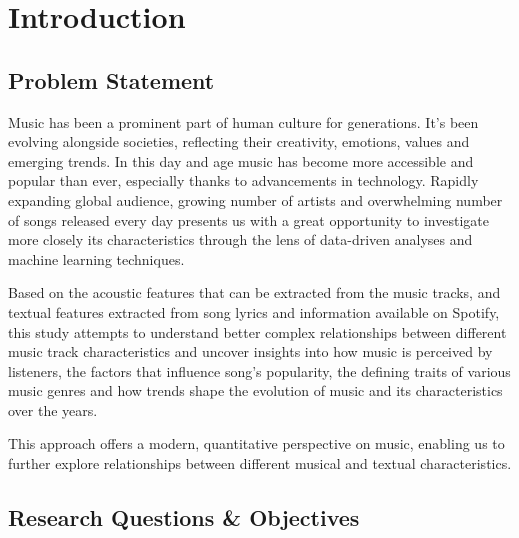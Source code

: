 \chapter{Introduction}
\label{cha:introduction}

\section{Problem Statement}
\label{sec:problemstatement}
Music has been a prominent part of human culture for generations. It's been
evolving alongside societies, reflecting their creativity, emotions, values and
emerging trends. In this day and age music has become more accessible and
popular than ever, especially thanks to advancements in technology. Rapidly
expanding global audience, growing number of artists and overwhelming number of
songs released every day presents us with a great opportunity to investigate
more closely its characteristics through the lens of data-driven analyses and
machine learning techniques. 

Based on the acoustic features that can be extracted from the music tracks, and
textual features extracted from song lyrics and information available on
Spotify, this study attempts to understand better complex relationships between
different music track characteristics and uncover insights into how music is
perceived by listeners, the factors that influence song's popularity, the
defining traits of various music genres and how trends shape the evolution of
music and its characteristics over the years. 

This approach offers a modern, quantitative perspective on music, enabling us
to further explore relationships between different musical and textual
characteristics.






\section{Research Questions \& Objectives}
\label{sec:researchquestions}


